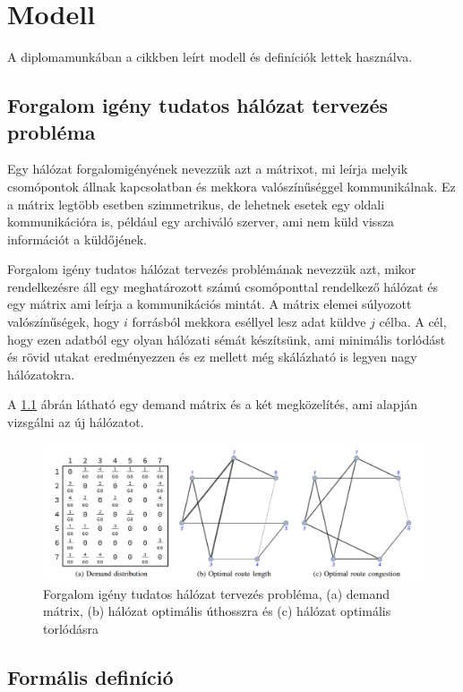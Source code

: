 \documentclass[12pt]{report}
\begin{document}
\chapter{Modell}


A diplomamunkában a \cite{avin_demand-aware_nodate} cikkben leírt modell és definíciók lettek használva.

\section{Forgalom igény tudatos hálózat tervezés probléma}

Egy hálózat forgalomigényének nevezzük azt a mátrixot, mi leírja melyik csomópontok állnak kapcsolatban és mekkora valószínűséggel kommunikálnak.
Ez a mátrix legtöbb esetben szimmetrikus, de lehetnek esetek egy oldali kommunikációra is, például egy archiváló szerver, ami nem küld vissza információt a küldőjének.

Forgalom igény tudatos hálózat tervezés problémának nevezzük azt, mikor rendelkezésre áll egy meghatározott számú csomóponttal rendelkező hálózat és egy mátrix ami leírja a kommunikációs mintát.
A mátrix elemei súlyozott valószínűségek, hogy $i$ forrásból mekkora eséllyel lesz adat küldve $j$ célba.
A cél, hogy ezen adatból egy olyan hálózati sémát készítsünk, ami minimális torlódást és rövid utakat eredményezzen és ez mellett még skálázható is legyen nagy hálózatokra.

A \ref{network_types} ábrán látható egy demand mátrix és a két megközelítés, ami alapján vizsgálni az új hálózatot.

\begin{figure}[h]
	\centering
	\includegraphics[width=14cm]{pictures/example.png}
	\caption{Forgalom igény tudatos hálózat tervezés probléma, (a) demand mátrix, (b) hálózat optimális úthosszra és (c) hálózat optimális torlódásra}
	\label{network_types}
\end{figure}

\section{Formális definíció}
\end{document}
